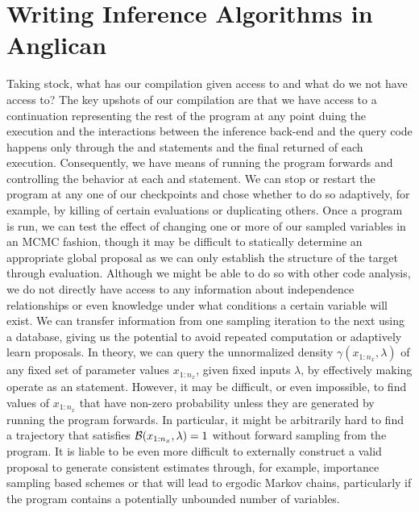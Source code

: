 
\section{Writing Inference Algorithms in Anglican}
\label{sec:proginf:inf}

Taking stock, what has our compilation
given access to and what do we not have access to?  The key upshots of our compilation are
that we have access to a continuation representing the rest of the program at any point
duing the execution and 
the interactions between the inference back-end and the query code happens only through
the \sample and \observe statements and the final returned \angstate of each execution.
Consequently, we have means of running the program
forwards and controlling the behavior at each \sample and \observe statement.  We can
stop or restart the program at any one of our checkpoints and chose whether to do so
adaptively, for example, by killing of certain evaluations or duplicating others.  Once
a program is run, we can test the effect of changing one or more of our sampled variables
in an MCMC fashion, though it may be difficult to statically determine an appropriate global proposal
as we can only establish the structure of the target through evaluation.  Although we might be
able to do so with other code analysis, we do not directly have access to any information
about independence relationships or even knowledge under what conditions a certain
variable will exist.  We can transfer information from one sampling iteration to the next
using a database, giving us the potential to avoid repeated computation or adaptively learn proposals.
In theory, we can query the unnormalized density $\gamma(x_{1:n_x},\lambda)$ of any fixed set of 
parameter values $x_{1:n_x}$, given fixed inputs $\lambda$, by effectively making
\sample operate as an \observe statement.  However, it may be difficult, or even impossible, to find
values of $x_{1:n_x}$ that have non-zero probability unless they are generated by running
the program forwards.  In particular, it might be arbitrarily hard to find a trajectory that satisfies
$\mathcal{B}(x_{1:n_x},\lambda)=1$ without forward sampling from the program.  It is liable
to be even more difficult to externally construct a valid proposal to generate consistent estimates
through, for example, importance sampling based schemes or that will lead to ergodic Markov chains,
particularly if the program contains a potentially unbounded number of variables.

